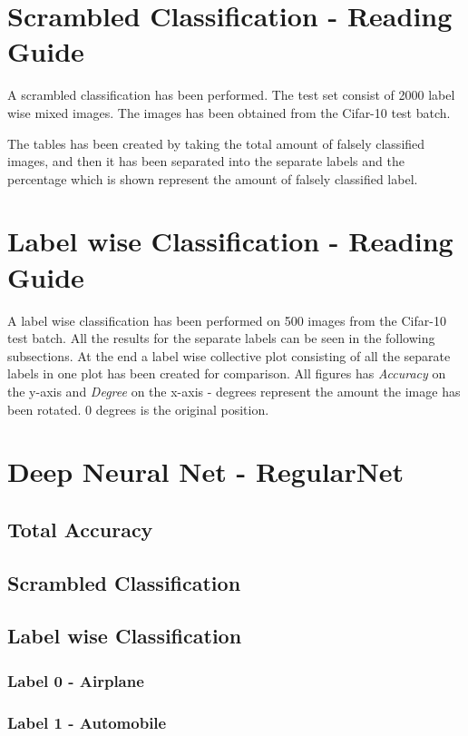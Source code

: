 \section{Scrambled Classification - Reading Guide}
A scrambled classification has been performed. The test set consist of 2000 label wise mixed images. The images has been obtained from the Cifar-10 test batch.

The tables has been created by taking the total amount of falsely classified images, and then it has been separated into the separate labels and the percentage which is shown represent the amount of falsely classified label.

\section{Label wise Classification - Reading Guide}
A label wise classification has been performed on 500 images from the Cifar-10 test batch. All the results for the separate labels can be seen in the following subsections. At the end a label wise collective plot consisting of all the separate labels in one plot has been created for comparison.
All figures has \emph{Accuracy} on the y-axis and \emph{Degree} on the x-axis - degrees represent the amount the image has been rotated. 0 degrees is the original position.

\section{Deep Neural Net - RegularNet}
\subsection{Total Accuracy}
\subsection{Scrambled Classification}
\subsection{Label wise Classification}
\subsubsection{Label 0 - Airplane}
\FloatBarrier
\subsubsection{Label 1 - Automobile}
\FloatBarrier
